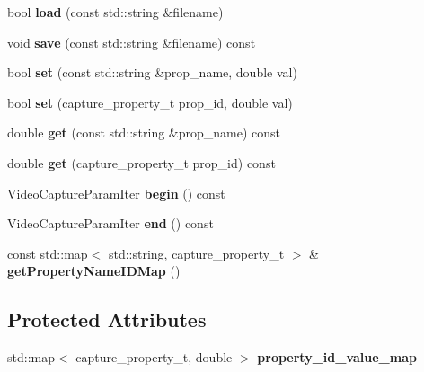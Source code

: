 \begin{DoxyCompactItemize}
bool {\bfseries load} (const std\+::string \&filename)
\item 
\hypertarget{classskl_1_1_video_capture_params_a32e66835b685c54a8e7f5a8fc6e9c8cc}{}\label{classskl_1_1_video_capture_params_a32e66835b685c54a8e7f5a8fc6e9c8cc} 
void {\bfseries save} (const std\+::string \&filename) const
\item 
\hypertarget{classskl_1_1_video_capture_params_ae44da21ef359988122f3fb6025e4a8e1}{}\label{classskl_1_1_video_capture_params_ae44da21ef359988122f3fb6025e4a8e1} 
bool {\bfseries set} (const std\+::string \&prop\+\_\+name, double val)
\item 
\hypertarget{classskl_1_1_video_capture_params_aab28c742742f07298daeccc69f1f5c5a}{}\label{classskl_1_1_video_capture_params_aab28c742742f07298daeccc69f1f5c5a} 
bool {\bfseries set} (capture\+\_\+property\+\_\+t prop\+\_\+id, double val)
\item 
\hypertarget{classskl_1_1_video_capture_params_ac56658132ec7f52191fb2472cf98722e}{}\label{classskl_1_1_video_capture_params_ac56658132ec7f52191fb2472cf98722e} 
double {\bfseries get} (const std\+::string \&prop\+\_\+name) const
\item 
\hypertarget{classskl_1_1_video_capture_params_aee1237be209c4fc391d6b669b12e3da9}{}\label{classskl_1_1_video_capture_params_aee1237be209c4fc391d6b669b12e3da9} 
double {\bfseries get} (capture\+\_\+property\+\_\+t prop\+\_\+id) const
\item 
\hypertarget{classskl_1_1_video_capture_params_a1ee73f1fa13bafbc81983f2ddc785900}{}\label{classskl_1_1_video_capture_params_a1ee73f1fa13bafbc81983f2ddc785900} 
Video\+Capture\+Param\+Iter {\bfseries begin} () const
\item 
\hypertarget{classskl_1_1_video_capture_params_aaa6f72614c3f0cda98cb317fae7661cb}{}\label{classskl_1_1_video_capture_params_aaa6f72614c3f0cda98cb317fae7661cb} 
Video\+Capture\+Param\+Iter {\bfseries end} () const
\item 
\hypertarget{classskl_1_1_video_capture_params_a2349d10365509e2ea4b8fa973b241c76}{}\label{classskl_1_1_video_capture_params_a2349d10365509e2ea4b8fa973b241c76} 
const std\+::map$<$ std\+::string, capture\+\_\+property\+\_\+t $>$ \& {\bfseries get\+Property\+Name\+I\+D\+Map} ()
\end{DoxyCompactItemize}
\subsection*{Protected Attributes}
\begin{DoxyCompactItemize}
\item 
\hypertarget{classskl_1_1_video_capture_params_a0a782d9ebee1e922da5245d776a224d8}{}\label{classskl_1_1_video_capture_params_a0a782d9ebee1e922da5245d776a224d8} 
std\+::map$<$ capture\+\_\+property\+\_\+t, double $>$ {\bfseries property\+\_\+id\+\_\+value\+\_\+map}
\end{DoxyCompactItemize}

